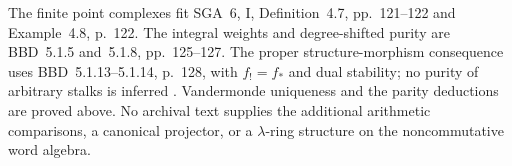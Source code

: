 The finite point complexes fit SGA~6, I, Definition~4.7,
pp.~121--122 and Example~4.8, p.~122.
The integral weights and degree-shifted purity are
BBD~5.1.5 and~5.1.8, pp.~125--127.
The proper structure-morphism consequence uses
BBD~5.1.13--5.1.14, p.~128, with \(f_!=f_*\) and dual
stability; no purity of arbitrary stalks is inferred
\cite{SGA6,BBD}.
Vandermonde uniqueness and the parity deductions are
proved above. No archival text supplies the additional
arithmetic comparisons, a canonical projector, or a
\(\lambda\)-ring structure on the noncommutative word algebra.


